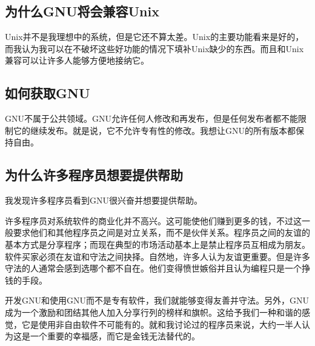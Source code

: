 \subsection{为什么GNU将会兼容Unix}
Unix并不是我理想中的系统，但是它还不算太差。Unix的主要功能看来是好的，而我认为我可以在不破坏这些好功能的情况下填补Unix缺少的东西。而且和Unix兼容可以让许多人能够方便地接纳它。\par
\subsection{如何获取GNU}
GNU不属于公共领域。GNU允许任何人修改和再发布，但是任何发布者都不能限制它的继续发布。就是说，它不允许专有性的修改。我想让GNU的所有版本都保持自由。\par
\subsection{为什么许多程序员想要提供帮助}
我发现许多程序员看到GNU很兴奋并想要提供帮助。\par
许多程序员对系统软件的商业化并不高兴。这可能使他们赚到更多的钱，不过这一般要求他们和其他程序员之间是对立关系，而不是伙伴关系。程序员之间的友谊的基本方式是分享程序；而现在典型的市场活动基本上是禁止程序员互相成为朋友。软件买家必须在友谊和守法之间抉择。自然地，许多人认为友谊更重要。但是许多守法的人通常会感到选哪个都不自在。他们变得愤世嫉俗并且认为编程只是一个挣钱的手段。\par
开发GNU和使用GNU而不是专有软件，我们就能够变得友善并守法。另外，GNU成为一个激励和团结其他人加入分享行列的榜样和旗帜。这给予我们一种和谐的感觉，它是使用非自由软件不可能有的。就和我讨论过的程序员来说，大约一半人认为这是一个重要的幸福感，而它是金钱无法替代的。\par
